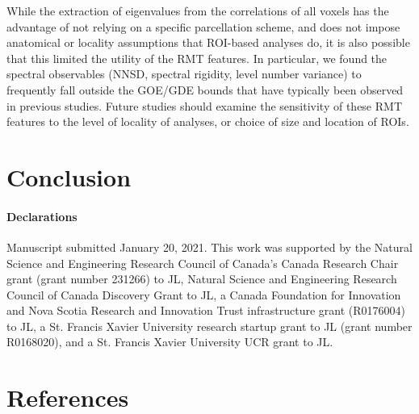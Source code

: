 While the extraction of eigenvalues from the correlations of all voxels has the advantage of not
relying on a specific parcellation scheme, and does not impose anatomical or locality assumptions
that ROI-based analyses do, it is also possible that this limited the utility of the RMT features.
In particular, we found the spectral observables (NNSD, spectral rigidity, level number variance) to
frequently fall outside the GOE/GDE bounds that have typically been observed in previous studies.
Future studies should examine the sensitivity of these RMT features to the level of locality of
analyses, or choice of size and location of ROIs.

\section{Conclusion}


\paragraph{Declarations}
Manuscript submitted January 20, 2021. This work was supported by the  Natural Science and
Engineering Research Council of Canada's Canada Research Chair grant (grant number 231266) to JL,
Natural Science and Engineering Research Council of Canada Discovery Grant to JL, a Canada
Foundation for Innovation and Nova Scotia Research and Innovation Trust infrastructure grant
(R0176004) to JL, a St. Francis Xavier University research startup grant to JL (grant number
R0168020), and a St. Francis Xavier University UCR grant to JL.

\section{References}
\printbibliography{}

